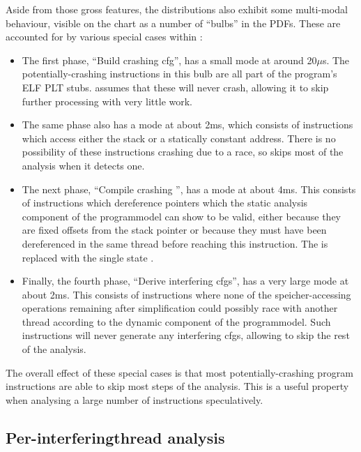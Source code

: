 Aside from those gross features, the distributions also exhibit some
multi-modal behaviour, visible on the chart as a number of ``bulbs''
in the PDFs.  These are accounted for by various special cases within
{\implementation}:
\begin{itemize}
\item The first phase, ``Build crashing \gls{cfg}'', has a small mode
  at around 20$\mu$s.  The potentially-crashing instructions in this
  bulb are all part of the program's ELF PLT stubs.  {\Implementation}
  assumes that these will never crash, allowing it to skip further
  processing with very little work.
\item The same phase also has a mode at about 2ms, which consists of
  instructions which access either the stack or a statically constant
  address.  There is no possibility of these instructions crashing due
  to a race, so {\implementation} skips most of the analysis when it
  detects one.
\item The next phase, ``Compile crashing {\StateMachine}'', has a mode
  at about 4ms.  This consists of instructions which dereference
  pointers which the static analysis component of the
  \gls{programmodel} can show to be valid, either because they are
  fixed offsets from the stack pointer or because they must have been
  dereferenced in the same thread before reaching this instruction.
  The {\StateMachine} is replaced with the single state {\stSurvive}.
\item Finally, the fourth phase, ``Derive interfering \glspl{cfg}'',
  has a very large mode at about 2ms.  This consists of instructions
  where none of the \gls{speicher}-accessing operations remaining
  after {\StateMachine} simplification could possibly race with
  another thread according to the dynamic component of the
  \gls{programmodel}.  Such instructions will never generate any
  interfering \glspl{cfg}, allowing {\technique} to skip the rest of
  the analysis.
\end{itemize}
The overall effect of these special cases is that most
potentially-crashing program instructions are able to skip most steps
of the analysis.  This is a useful property when analysing a large
number of instructions speculatively.

\subsection{Per-\gls{interferingthread} analysis}
\label{sect:eval:how:per_interfering}

